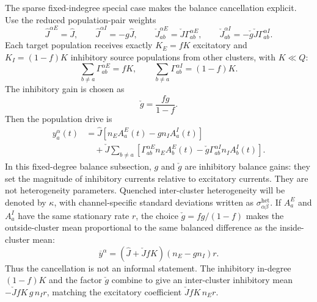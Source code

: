 The sparse fixed-indegree special case makes the balance cancellation explicit.
Use the reduced population-pair weights
\begin{equation}
    \widehat J^{\alpha E}=\widehat J,
    \qquad
    \widehat J^{\alpha I}=-g\widehat J,
    \qquad
    \check J_{ab}^{\alpha E}=\check J\Gamma_{ab}^{\alpha E},
    \qquad
    \check J_{ab}^{\alpha I}=-\check g\check J\Gamma_{ab}^{\alpha I}.
    \label{eq:ch08-fixed-degree-weights}
\end{equation}
Each target population receives exactly \(K_E=fK\) excitatory and
\(K_I=(1-f)K\) inhibitory source populations from other clusters, with
\(K\ll Q\):
\begin{equation}
    \sum_{b\ne a}\Gamma_{ab}^{\alpha E}=fK,
    \qquad
    \sum_{b\ne a}\Gamma_{ab}^{\alpha I}=(1-f)K .
    \label{eq:ch08-fixed-degree-row-sums}
\end{equation}
The inhibitory gain is chosen as
\begin{equation}
    \check g=\frac{fg}{1-f}.
    \label{eq:ch08-fixed-degree-gcheck}
\end{equation}
Then the population drive is
\begin{equation}
\begin{aligned}
    y_a^\alpha(t)
    &=
    \widehat J
    \left[
        n_E A_a^E(t)-g n_I A_a^I(t)
    \right]
    \\
    &\quad+
    \check J
    \sum_{b\ne a}
    \left[
        \Gamma_{ab}^{\alpha E}n_E A_b^E(t)
        -
        \check g\Gamma_{ab}^{\alpha I}n_I A_b^I(t)
    \right].
\end{aligned}
\label{eq:ch08-fixed-degree-drive}
\end{equation}
In this fixed-degree balance subsection, \(g\) and \(\check g\) are inhibitory
balance gains: they set the magnitude of inhibitory currents relative to
excitatory currents. They are not heterogeneity parameters. Quenched
inter-cluster heterogeneity will be denoted by \(\kappa\), with channel-specific
standard deviations written as \(\sigma_{\alpha\beta}^{\mathrm{het}}\).
If \(A_a^E\) and \(A_a^I\) have the same stationary rate \(r\), the choice
\(\check g=fg/(1-f)\) makes the outside-cluster mean proportional to the same
balanced difference as the inside-cluster mean:
\begin{equation}
    \overline y^\alpha
    =
    \left(\widehat J+\check J fK\right)
    \left(n_E-g n_I\right)r .
    \label{eq:ch08-fixed-degree-mean}
\end{equation}
Thus the cancellation is not an informal statement. The inhibitory in-degree
\((1-f)K\) and the factor \(\check g\) combine to give an inter-cluster
inhibitory mean \(-\check J fK\,g\,n_I r\), matching the excitatory coefficient
\(\check J fK\,n_E r\).

